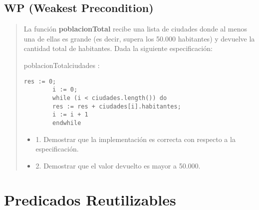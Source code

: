 \documentclass[10pt,a4paper]{article}
\begin{document}
\subsection{WP (Weakest Precondition)}
\begin{quote}
	La función \textbf{poblacionTotal} recibe una lista de ciudades donde al menos una de ellas es grande (es decir, supera los
	50.000 habitantes) y devuelve la cantidad total de habitantes. Dada la siguiente especificación:
	\begin{proc}{poblacionTotal}{\In ciudades : }{\ent}
	\end{proc}
	\begin{lstlisting}[caption={},label=code:for]
		res := 0;
		i := 0;
		while (i < ciudades.length()) do
		res := res + ciudades[i].habitantes;
		i := i + 1
		endwhile
	\end{lstlisting}
	\begin{itemize}
		\item 1. Demostrar que la implementación es correcta con respecto a la especificación.
		\item 2. Demostrar que el valor devuelto es mayor a 50.000.
	\end{itemize}
\end{quote}

\section{Predicados Reutilizables}
\end{document}
